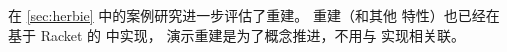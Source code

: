 在 \autoref{sec:herbie} 中的案例研究进一步评估了重建。
  重建（和其他 \egg 特性）也已经在基于 Racket 的 \egraph 中实现，
  演示重建是为了概念推进，不用与 \egg 实现相关联。 %

